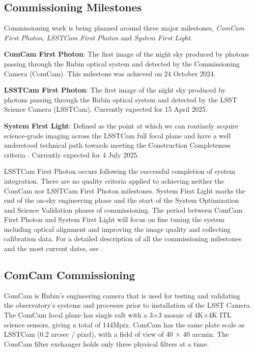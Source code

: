 \subsection{Commissioning Milestones}
\label{ssec:commissioning-milestones}

Commissioning work is being planned around three major milestones, \textit{ComCam First Photon}, \textit{LSSTCam First Photon} and \textit{System First Light}. 

\textbf{ComCam First Photon}: The first image of the night sky produced by photons passing through the Rubin optical system and detected by the Commissioning Camera (ComCam). 
This milestone was achieved on 24 October 2024. 

\textbf {LSSTCam First Photon}: The first image of the night sky produced by photons passing through the Rubin optical system and detected by the LSST Science Camera (LSSTCam).
Currently expected  for 15 April 2025.

\textbf {System First Light}: Defined as the point at which we can routinely acquire science-grade imaging across the LSSTCam full focal plane and have a well understood technical path towards meeting the Construction Completeness criteria   .
Currently expected for 4 July 2025. 

LSSTCam First Photon occurs following the successful completion of system integration. 
There are no quality criteria applied to achieving  neither the ComCam nor LSSTCam First Photon milestones. 
System First Light  marks the end of the  on-sky engineering phase and the start of the System Optimization and Science Validation phases of commissioning.
The period between ComCam First Photon and System First Light will focus on fine tuning the system including optical alignment and improving the image quality and collecting calibration data.
For a detailed description of all the commissioning milestones and the most current dates, see .

\subsection{ComCam Commissioning }
\label{ssec:commissioning-comcam}

ComCam is Rubin's engineering camera that is used for testing and validating the observatory's systems and processes prior to installation of the LSST Camera.
The ComCam focal plane has single raft with a 3×3 mosaic of 4K×4K ITL science sensors, giving a total of 144Mpix. 
ComCam has the same plate scale as LSSTCam (0.2 arcsec / pixel), with a field of view of 40  × 40 arcmin. 
The ComCam filter exchanger holds only three physical filters at a time.

